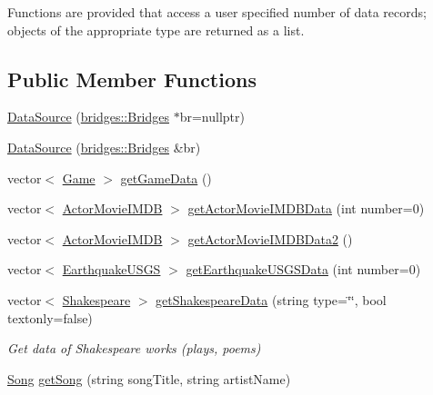 Functions are provided that access a user specified number of data records; objects of the appropriate type are returned as a list. \subsection*{Public Member Functions}
\begin{DoxyCompactItemize}
\item 
\mbox{\hyperlink{classbridges_1_1_data_source_afc95b52d2ca03a92c1f1ee1594a097c7}{Data\+Source}} (\mbox{\hyperlink{classbridges_1_1_bridges}{bridges\+::\+Bridges}} $\ast$br=nullptr)
\item 
\mbox{\hyperlink{classbridges_1_1_data_source_a0da0dc59d798aa3266df7931a396a4c9}{Data\+Source}} (\mbox{\hyperlink{classbridges_1_1_bridges}{bridges\+::\+Bridges}} \&br)
\item 
vector$<$ \mbox{\hyperlink{classbridges_1_1dataset_1_1_game}{Game}} $>$ \mbox{\hyperlink{classbridges_1_1_data_source_aa902e1dffd4169e2f6e6820299b8cde1}{get\+Game\+Data}} ()
\item 
vector$<$ \mbox{\hyperlink{classbridges_1_1dataset_1_1_actor_movie_i_m_d_b}{Actor\+Movie\+I\+M\+DB}} $>$ \mbox{\hyperlink{classbridges_1_1_data_source_a664694136550312ab3f5a82bebb91bca}{get\+Actor\+Movie\+I\+M\+D\+B\+Data}} (int number=0)
\item 
vector$<$ \mbox{\hyperlink{classbridges_1_1dataset_1_1_actor_movie_i_m_d_b}{Actor\+Movie\+I\+M\+DB}} $>$ \mbox{\hyperlink{classbridges_1_1_data_source_a00f0a0a1871d4864c6ccdd04195e0fb2}{get\+Actor\+Movie\+I\+M\+D\+B\+Data2}} ()
\item 
vector$<$ \mbox{\hyperlink{classbridges_1_1dataset_1_1_earthquake_u_s_g_s}{Earthquake\+U\+S\+GS}} $>$ \mbox{\hyperlink{classbridges_1_1_data_source_a6645e2029915550fcac5f9fed7870119}{get\+Earthquake\+U\+S\+G\+S\+Data}} (int number=0)
\item 
vector$<$ \mbox{\hyperlink{classbridges_1_1dataset_1_1_shakespeare}{Shakespeare}} $>$ \mbox{\hyperlink{classbridges_1_1_data_source_a8b73299a4c1c71d2e32431a8d4a7be81}{get\+Shakespeare\+Data}} (string type=\char`\"{}\char`\"{}, bool textonly=false)
\begin{DoxyCompactList}\small\item\em Get data of Shakespeare works (plays, poems) \end{DoxyCompactList}\item 
\mbox{\hyperlink{classbridges_1_1dataset_1_1_song}{Song}} \mbox{\hyperlink{classbridges_1_1_data_source_a284c9d572415b67df6989ab8ab97d0e2}{get\+Song}} (string song\+Title, string artist\+Name)

\end{DoxyCompactItemize}

